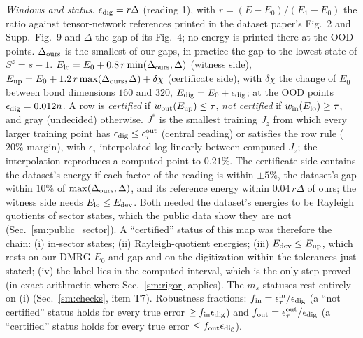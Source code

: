 \documentclass[aps,prx,onecolumn,10pt,nofootinbib,longbibliography,floatfix]{revtex4-2}
\theoremstyle{remark}
\newcommand{\Jz}{J_z}
\newcommand{\ms}{m_s}
\begin{document}
\emph{Windows and status.} $\epsilon_{\rm dig}=r\Delta$ (reading 1), with $r=(E-E_0)/(E_1-E_0)$ the ratio against
tensor-network references printed in the dataset paper's Fig.~2 and Supp.\ Fig.~9 and $\Delta$ the gap of its Fig.~4; %
no energy is printed there at the OOD points. $\Delta_{\rm ours}$ is the smallest of our gaps, in practice the gap to the
lowest state of $S^z=s-1$. $E_{\rm lo}=E_0+0.8\,r\min(\Delta_{\rm ours},\Delta)$ %
(witness side), $E_{\rm up}=E_0+1.2\,r\max(\Delta_{\rm ours},\Delta)+\delta\chi$ (certificate side), with $\delta\chi$ %
the change of $E_0$ between bond dimensions $160$ and $320$, %
$E_{\rm dig}=E_0+\epsilon_{\rm dig}$; at the OOD points $\epsilon_{\rm dig}=0.012n$. A row is \emph{certified} if %
$w_{\rm out}(E_{\rm up})\le\tau$, \emph{not certified} if $w_{\rm in}(E_{\rm lo})\ge\tau$, and gray (undecided)
otherwise. $J^*$ is the smallest training $\Jz$ from which every larger training point has
$\epsilon_{\rm dig}\le\epsilon_\tau^{\rm out}$ (central reading) or satisfies the row rule ($20\%$ margin), with %
$\epsilon_\tau$ interpolated log-linearly between computed $\Jz$; the interpolation reproduces a computed point to
$0.21\%$. The certificate side contains the %
dataset's energy if each factor of the reading is within $\pm5\%$, the dataset's gap within $10\%$ of %
$\max(\Delta_{\rm ours},\Delta)$, and its reference energy within $0.04\,r\Delta$ of ours; the witness side needs %
$E_{\rm lo}\le E_{\rm dev}$. Both needed the dataset's energies to be Rayleigh quotients of sector states, which the
public data show they are not (Sec.~\ref{sm:public_sector}). A ``certified'' status of this map was therefore the
chain: (i) in-sector states; (ii) Rayleigh-quotient
energies; (iii) $E_{\rm dev}\le E_{\rm up}$, which rests on our DMRG $E_0$ and gap and on the digitization within the
tolerances just stated; (iv) the label lies in the computed interval, which is the only step proved (in exact
arithmetic where Sec.~\ref{sm:rigor} applies). The $\ms$ statuses rest entirely on (i) (Sec.~\ref{sm:checks}, item
T7). Robustness fractions: $f_{\rm in}=\epsilon_\tau^{\rm in}/\epsilon_{\rm dig}$ (a ``not certified''
status holds for every true error $\ge f_{\rm in}\epsilon_{\rm dig}$) and $f_{\rm out}=\epsilon_\tau^{\rm
out}/\epsilon_{\rm dig}$ (a ``certified'' status holds for every true error $\le f_{\rm out}\epsilon_{\rm dig}$).
\end{document}
